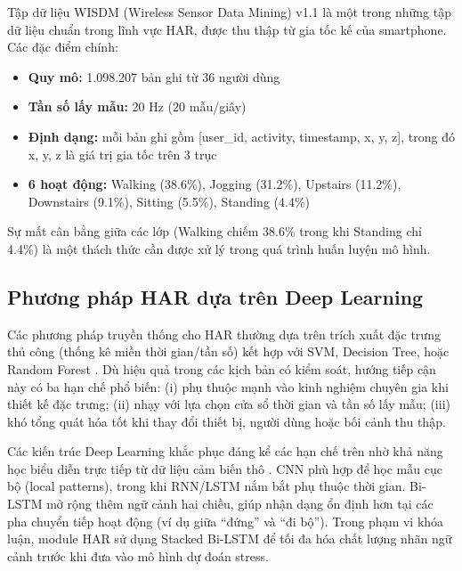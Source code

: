 Tập dữ liệu WISDM (Wireless Sensor Data Mining) v1.1 \cite{kwapisz2010activity} là một trong những tập dữ liệu chuẩn trong lĩnh vực HAR, được thu thập từ gia tốc kế của smartphone. Các đặc điểm chính:

\begin{itemize}
    \item \textbf{Quy mô:} 1.098.207 bản ghi từ 36 người dùng
    \item \textbf{Tần số lấy mẫu:} 20 Hz (20 mẫu/giây)
    \item \textbf{Định dạng:} mỗi bản ghi gồm [user\_id, activity, timestamp, x, y, z], trong đó x, y, z là giá trị gia tốc trên 3 trục
    \item \textbf{6 hoạt động:} Walking (38.6\%), Jogging (31.2\%), Upstairs (11.2\%), Downstairs (9.1\%), Sitting (5.5\%), Standing (4.4\%)
\end{itemize}

Sự mất cân bằng giữa các lớp (Walking chiếm 38.6\% trong khi Standing chỉ 4.4\%) là một thách thức cần được xử lý trong quá trình huấn luyện mô hình.

\subsection{Phương pháp HAR dựa trên Deep Learning}

Các phương pháp truyền thống cho HAR thường dựa trên trích xuất đặc trưng thủ công (thống kê miền thời gian/tần số) kết hợp với SVM, Decision Tree, hoặc Random Forest \cite{bulling2014tutorial}. Dù hiệu quả trong các kịch bản có kiểm soát, hướng tiếp cận này có ba hạn chế phổ biến: (i) phụ thuộc mạnh vào kinh nghiệm chuyên gia khi thiết kế đặc trưng; (ii) nhạy với lựa chọn cửa sổ thời gian và tần số lấy mẫu; (iii) khó tổng quát hóa tốt khi thay đổi thiết bị, người dùng hoặc bối cảnh thu thập.

Các kiến trúc Deep Learning khắc phục đáng kể các hạn chế trên nhờ khả năng học biểu diễn trực tiếp từ dữ liệu cảm biến thô \cite{ordonez2016deep, chen2021deep}. CNN phù hợp để học mẫu cục bộ (local patterns), trong khi RNN/LSTM nắm bắt phụ thuộc thời gian. Bi-LSTM mở rộng thêm ngữ cảnh hai chiều, giúp nhận dạng ổn định hơn tại các pha chuyển tiếp hoạt động (ví dụ giữa ``đứng'' và ``đi bộ''). Trong phạm vi khóa luận, module HAR sử dụng Stacked Bi-LSTM để tối đa hóa chất lượng nhãn ngữ cảnh trước khi đưa vào mô hình dự đoán stress.


